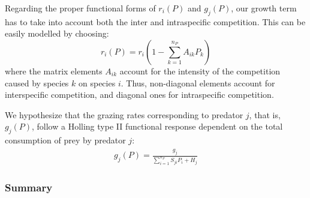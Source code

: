 Regarding the proper functional forms of $r_i(P)$ and $g_j(P)$, our growth term has to take into account both the inter and intraspecific competition. This can be easily modelled by choosing:
%
\begin{equation}
\label{eq:r}
	r_i(P) = r_i \left( 1 - \sum_{k=1}^{n_P} A_{ik} P_k \right)
\end{equation}
%
where the matrix elements $A_{ik}$ account for the intensity of the competition caused by species $k$ on species $i$. Thus, non-diagonal elements account for interspecific competition, and diagonal ones for intraspecific competition.

We hypothesize that the grazing rates corresponding to predator $j$, that is, $g_j(P)$, follow a Holling type II functional response dependent on the total consumption of prey by predator $j$:
%
\begin{eqnarray}
\label{eq:g}
	g_j(P) = \frac{g_j}{\sum_{i=1}^{n_P} S_{ji} P_i + H_j}
\end{eqnarray}
%

\subsubsection{Summary}
\label{subsubsec:SummaryPredation}

